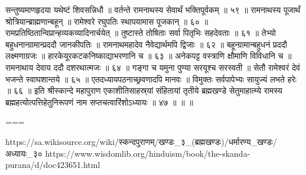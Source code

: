 सन्तुष्यमाणहृदया यथेष्टं शिवसन्निधौ ॥
वर्तन्ते रामनाथस्य सेवार्थं भक्तिपूर्वकम् ॥ ५९ ॥
रामनाथस्य पूजार्थं श्रोत्रियान्ब्राह्मणान्बहून् ॥
रामेश्वरे रघुपतिः स्थापयामास पूजकान् ॥ ६० ॥
रामप्रतिष्ठितान्विप्रान्हव्यकव्यादिनार्चयेत् ॥
तुष्टास्ते तोषिताः सर्वा पितृभिः सहदेवताः ॥ ६१ ॥
तेभ्यो बहुधनान्ग्रामान्प्रददौ जानकीपतिः ॥
रामनाथमहादेव नैवेद्यार्थमपि द्विजाः ॥ ६२ ॥
बहून्ग्रामान्बहुधनं प्रददौ लक्ष्मणाग्रजः ॥
हारकेयूरकटकनिष्काद्याभरणानि च ॥ ६३ ॥
अनेकपट्ट वस्त्राणि क्षौमाणि विविधानि च ॥
रामनाथाय देवाय ददौ दशरथात्मजः ॥ ६४ ॥
गङ्गा च यमुना पुण्या सरयूश्च सरस्वती ॥
सेतौ रामेश्वरं देवं भजन्ते स्वाघशान्तये ॥ ६५ ॥
एतदध्यायपठनाच्छ्रवणादपि मानवः ॥
विमुक्तः सर्वपापेभ्यः सायुज्यं लभते हरेः ॥ ६६ ॥
इति श्रीस्कान्दे महापुराण एकाशीतिसाहस्र्यां संहितायां तृतीये ब्रह्मखण्डे सेतुमाहात्म्ये रामस्य ब्रह्महत्योत्पत्तिहेतुनिरूपणं नाम सप्तचत्वारिंशोऽध्यायः ॥ ४७ ॥ ॥ ॥

===

https://sa.wikisource.org/wiki/स्कन्दपुराणम्/खण्डः_३_(ब्रह्मखण्डः)/धर्मारण्य_खण्डः/अध्यायः_३०
https://www.wisdomlib.org/hinduism/book/the-skanda-purana/d/doc423651.html

